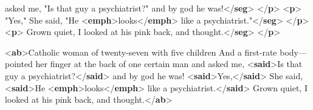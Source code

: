 \begin{shaded}
\hspace*{1em}\hspace*{1em} asked me, "Is that guy a psychiatrist?" and by god he was!{</\textbf{seg}>}\mbox{}\newline 
{</\textbf{p}>}\mbox{}\newline 
{<\textbf{p}>}\mbox{}\newline 
{}"Yes," She said, "He {<\textbf{emph}>}looks{</\textbf{emph}>} like a\mbox{}\newline 
\hspace*{1em}\hspace*{1em} psychiatrist."{</\textbf{seg}>}\mbox{}\newline 
{</\textbf{p}>}\mbox{}\newline 
{<\textbf{p}>}\mbox{}\newline 
{}Grown quiet, I looked at his pink back, and thought.{</\textbf{seg}>}\mbox{}\newline 
{</\textbf{p}>}\end{shaded}\egroup\par \noindent  \par\bgroup{}\exampleFont \begin{shaded}\noindent\mbox{}{<\textbf{ab}>}Catholic woman of twenty-seven with five children And a first-rate\mbox{}\newline 
 body—pointed her finger at the back of one certain man and asked me,\mbox{}\newline 
{<\textbf{said}>}Is that guy a psychiatrist?{</\textbf{said}>} and by god he was!\mbox{}\newline 
{<\textbf{said}>}Yes,{</\textbf{said}>} She said, {<\textbf{said}>}He {<\textbf{emph}>}looks{</\textbf{emph}>} like a\mbox{}\newline 
\hspace*{1em}\hspace*{1em} psychiatrist.{</\textbf{said}>} Grown quiet, I looked at his pink back, and\mbox{}\newline 
 thought.{</\textbf{ab}>}\end{shaded}\egroup\par \par
